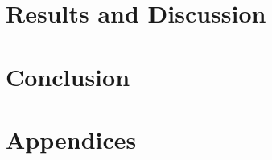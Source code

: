 \documentclass[12pt, openany]{book}
\begin{document}
\chapter{Results and Discussion}



\chapter{Conclusion}


\clearpage %


\newpage
\chapter{Appendices}
\begin{appendices}
	\renewcommand{\thesection}{\arabic{section}}
\end{appendices}
\end{document}
